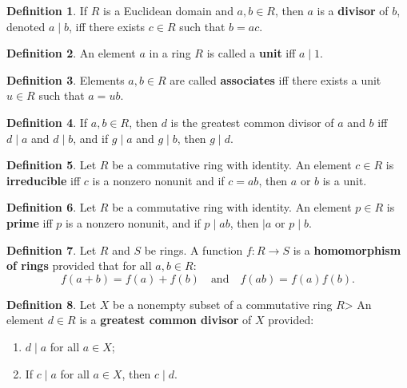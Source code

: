 \documentclass{article}
\theoremstyle{definition}
\newtheorem{definition}{Definition}[section]
\theoremstyle{remark}
\theoremstyle{definition}
\begin{document}
    \begin{definition}\label{df:1.13}
        If $R$ is a Euclidean domain and $a,b\in R$, then $a$ is a \textbf{divisor} of $b$, denoted $a\mid b$, iff there exists $c\in R$ such that $b=ac$.
    \end{definition}
    
    \begin{definition}\label{df:1.14}
        An element $a$ in a ring $R$ is called a \textbf{unit} iff $a\mid 1$.
    \end{definition}
    
    \begin{definition}\label{df:1.15}
        Elements $a,b\in R$ are called \textbf{associates} iff there exists a unit $u\in R$ such that $a=ub$. 
    \end{definition}
    
    \begin{definition}\label{df:1.16}
        If $a,b\in R$, then $d$ is the greatest common divisor of $a$ and $b$ iff $d\mid a$ and $d\mid b$, and if $g\mid a$ and $g\mid b$, then $g\mid d$.
    \end{definition}
    
    \begin{definition}\label{df:1.17}
        Let $R$ be a commutative ring with identity. An element $c\in R$ is \textbf{irreducible} iff $c$ is a nonzero nonunit and if $c=ab$, then $a$ or $b$ is a unit. 
    \end{definition}
    
    \begin{definition}\label{df:1.18}
        Let $R$ be a commutative ring with identity. An element $p\in R$ is \textbf{prime} iff $p$ is a nonzero nonunit, and if $p\mid ab$, then $\mid a$ or $p\mid b$.
    \end{definition}
    
    \begin{definition}\label{df:1.19}
        Let $R$ and $S$ be rings. A function $f\colon R\rightarrow S$ is a \textbf{homomorphism of rings} provided that for all $a,b\in R$:
            \begin{equation*}
                f(a+b)=f(a)+f(b)\quad\text{and}\quad f(ab)=f(a)f(b).
            \end{equation*}
    \end{definition}
    
    \begin{definition}\label{df:1.20}
        Let $X$ be a nonempty subset of a commutative ring $R$> An element $d\in R$ is a \textbf{greatest common divisor} of $X$ provided:
            \begin{enumerate}[label=(\roman*)]
                \item $d\mid a$ for all $a\in X$;
                \item If $c\mid a$ for all $a\in X$, then $c\mid d$.
            \end{enumerate}
    \end{definition}
    
\end{document}
